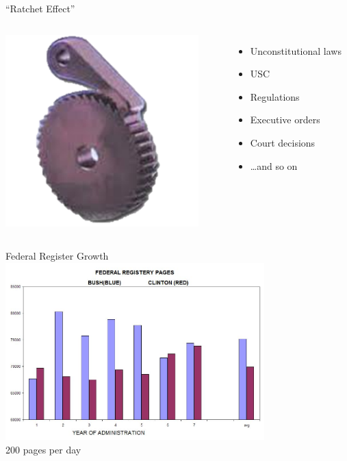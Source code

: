 \begin{frame}{``Ratchet Effect''}
    \begin{columns}[onlytextwidth]
            \centering
            \includegraphics[width=0.9\textwidth]{img/catch.png} \\

            \begin{itemize}
                \item Unconstitutional laws
                \item USC
                \item Regulations
                \item Executive orders
                \item Court decisions
                \item \ldots and so on
            \end{itemize}
            
    \end{columns}
\end{frame}

\begin{frame}{Federal Register Growth}
    \centering
    \includegraphics[width=0.75\textwidth]{img/fed-reg-graph.png} \\
    { \large 200 pages per day \\}
\end{frame}

